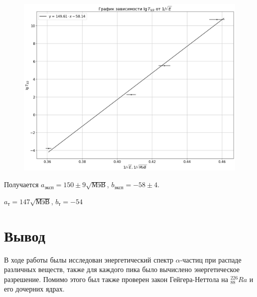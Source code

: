 \documentclass[a4paper,12pt]{article}
\begin{document}
\begin{figure}[H]
\centering
\includegraphics[scale=0.5]{graph3.png}
\end{figure}
Получается $a_\text{эксп} = 150 \pm 9 \sqrt{\text{МэВ}}$, $b_\text{эксп} = -58 \pm 4$.

$a_\text{т} = 147 \sqrt{\text{МэВ}}$, $b_\text{т} = -54$

\section*{Вывод}
В ходе работы былы исследован энергетический спектр $\alpha$-частиц при распаде различных веществ, также для каждого пика было вычислено энергетическое разрешение. Помимо этого был также проверен закон Гейгера-Неттола на $^{226}_{88}Ra$ и его дочерних ядрах.
\end{document}
